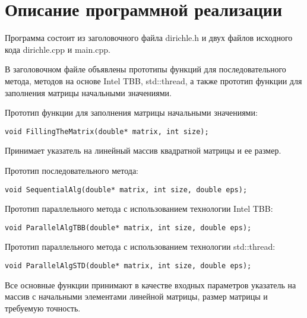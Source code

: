 \documentclass{report}
\begin{document}
\section*{Описание программной реализации}
Программа состоит из заголовочного файла dirichle.h и двух файлов исходного кода dirichle.cpp и main.cpp.
\par В заголовочном файле объявлены прототипы функций для последовательного метода, методов на основе Intel TBB, std::thread, а также прототип функции для заполнения матрицы начальными значениями.
\par Прототип функции для заполнения матрицы начальными значениями:
\begin{lstlisting}
void FillingTheMatrix(double* matrix, int size);
\end{lstlisting}
Принимает указатель на линейный массив квадратной матрицы и ее размер.
\par Прототип последовательного метода:
\begin{lstlisting}
void SequentialAlg(double* matrix, int size, double eps);
\end{lstlisting}
\par Прототип параллельного метода с использованием технологии Intel TBB:
\begin{lstlisting}
void ParallelAlgTBB(double* matrix, int size, double eps);
\end{lstlisting}
\par Прототип параллельного метода с использованием технологии std::thread:
\begin{lstlisting}
void ParallelAlgSTD(double* matrix, int size, double eps);
\end{lstlisting}
\par Все основные функции принимают в качестве входных параметров указатель на массив с начальными элементами линейной матрицы, размер матрицы и требуемую точность.
\newpage

\end{document}
